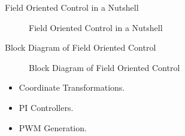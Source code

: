 \begin{frame}{Field Oriented Control in a Nutshell}
	\begin{figure}
		\centering
		\caption{Field Oriented Control in a Nutshell}
	\end{figure}
\end{frame}
\begin{frame}{Block Diagram of Field Oriented Control}
	\begin{figure}
		\centering
		\caption{Block Diagram of Field Oriented Control}
	\end{figure}
	\begin{itemize}
		\item Coordinate Transformations.
		\item PI Controllers.
		\item PWM Generation.
	\end{itemize}
\end{frame}


